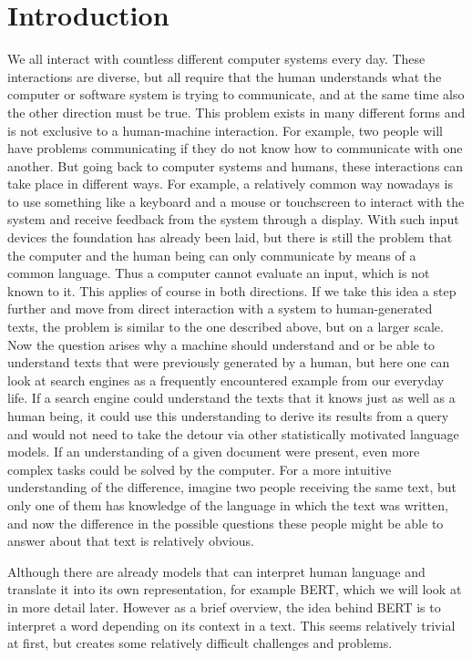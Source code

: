 \color{red}
\chapter{Introduction}
We all interact with countless different computer systems every day. These interactions are diverse, but all require that the human understands what the computer or software system is trying to communicate, and at the same time also the other direction must be true. This problem exists in many different forms and is not exclusive to a human-machine interaction. For example, two people will have problems communicating if they do not know how to communicate with one another. But going back to computer systems and humans, these interactions can take place in different ways. For example, a relatively common way nowadays is to use something like a keyboard and a mouse or touchscreen to interact with the system and receive feedback from the system through a display. With such input devices the foundation has already been laid, but there is still the problem that the computer and the human being can only communicate by means of a common language. Thus a computer cannot evaluate an input, which is not known to it. This applies of course in both directions. If we take this idea a step further and move from direct interaction with a system to human-generated texts, the problem is similar to the one described above, but on a larger scale. Now the question arises why a machine should understand and or be able to understand texts that were previously generated by a human, but here one can look at search engines as a frequently encountered example from our everyday life. If a search engine could understand the texts that it knows just as well as a human being, it could use this understanding to derive its results from a query and would not need to take the detour via other statistically motivated language models. If an understanding of a given document were present, even more complex tasks could be solved by the computer. For a more intuitive understanding of the difference, imagine two people receiving the same text, but only one of them has knowledge of the language in which the text was written, and now the difference in the possible questions these people might be able to answer about that text is relatively obvious.

Although there are already models that can interpret human language and translate it into its own representation, for example BERT, which we will look at in more detail later. However as a brief overview, the idea behind BERT is to interpret a word depending on its context in a text. This seems relatively trivial at first, but creates some relatively difficult challenges and problems.  

